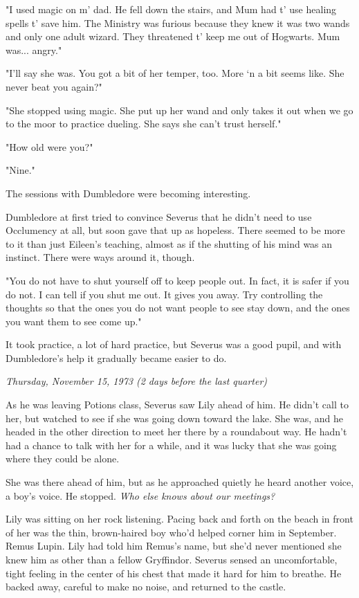 \documentclass[a4paper,11pt]{article}
\begin{document}
"I used magic on m' dad. He fell down the stairs, and Mum had t' use healing spells t' save him. The Ministry was furious because they knew it was two wands and only one adult wizard. They threatened t' keep me out of Hogwarts. Mum was... angry."

"I'll say she was. You got a bit of her temper, too. More `n a bit seems like. She never beat you again?"

"She stopped using magic. She put up her wand and only takes it out when we go to the moor to practice dueling. She says she can't trust herself."

"How old were you?"

"Nine."

The sessions with Dumbledore were becoming interesting.

Dumbledore at first tried to convince Severus that he didn't need to use Occlumency at all, but soon gave that up as hopeless. There seemed to be more to it than just Eileen's teaching, almost as if the shutting of his mind was an instinct. There were ways around it, though.

"You do not have to shut yourself off to keep people out. In fact, it is safer if you do not. I can tell if you shut me out. It gives you away. Try controlling the thoughts so that the ones you do not want people to see stay down, and the ones you want them to see come up."

It took practice, a lot of hard practice, but Severus was a good pupil, and with Dumbledore's help it gradually became easier to do.

\emph{Thursday, November 15, 1973 (2 days before the last quarter)}

As he was leaving Potions class, Severus saw Lily ahead of him. He didn't call to her, but watched to see if she was going down toward the lake. She was, and he headed in the other direction to meet her there by a roundabout way. He hadn't had a chance to talk with her for a while, and it was lucky that she was going where they could be alone.

She was there ahead of him, but as he approached quietly he heard another voice, a boy's voice. He stopped. \emph{Who else knows about our meetings?}

Lily was sitting on her rock listening. Pacing back and forth on the beach in front of her was the thin, brown-haired boy who'd helped corner him in September. Remus Lupin. Lily had told him Remus's name, but she'd never mentioned she knew him as other than a fellow Gryffindor. Severus sensed an uncomfortable, tight feeling in the center of his chest that made it hard for him to breathe. He backed away, careful to make no noise, and returned to the castle.
\end{document}
